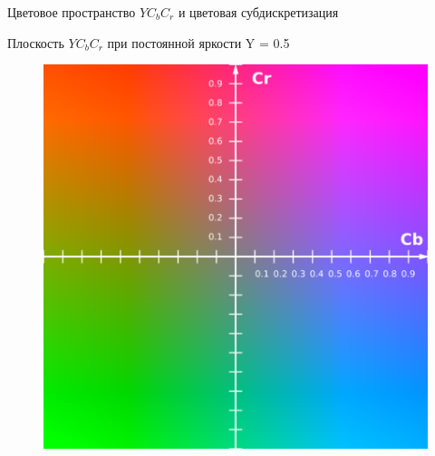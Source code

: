 \documentclass[11pt]{beamer}
\begin{document}
\begin{frame}{Цветовое пространство $YC_bC_r$ и цветовая субдискретизация}
\begin{block}{Плоскость $YC_bC_r$ при постоянной яркости Y = 0.5}
\begin{figure}[H]
	\begin{center}
		\includegraphics[scale=0.5]{../pics/YCbCr/YCbCr.png}
	\end{center}
\end{figure}	
\end{block}			
\end{frame}
\end{document}

